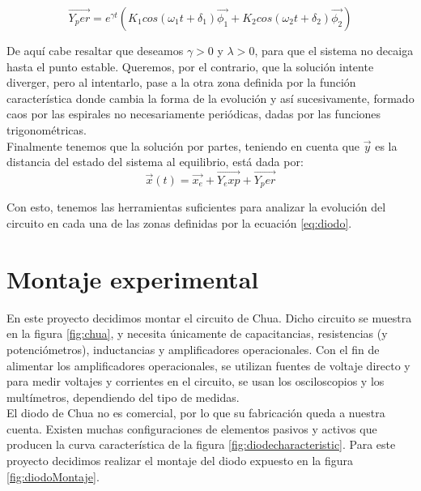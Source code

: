 \documentclass[%
 reprint,
 amsmath,amssymb,
 aps,
]{revtex4-1}
\begin{document}
\begin{equation}
\vec{Y_per} = e^{\gamma t}(K_1cos(\omega_1t+\delta_1)\vec{\phi_1}+
 K_2cos(\omega_2t+\delta_2)\vec{\phi_2})
\end{equation}

De aquí cabe resaltar que deseamos $\gamma >0$ y $\lambda> 0$, para que el sistema no decaiga hasta el punto estable. Queremos, por el contrario, que la solución intente diverger, pero al intentarlo, pase a la otra zona definida por la función característica donde cambia la forma de la evolución y así sucesivamente, formado caos por las espirales no necesariamente periódicas, dadas por las funciones trigonométricas.\\

Finalmente tenemos que la solución por partes, teniendo en cuenta que $\vec{y}$ es la distancia del estado del sistema al equilibrio, está dada por:\\

\begin{equation}
\vec{x}(t) = \vec{x_e}+ \vec{Y_exp} + \vec{Y_per}
\label{sis}
\end{equation}

Con esto, tenemos las herramientas suficientes para analizar la evolución del circuito en cada una de las zonas definidas por la ecuación \ref{eq:diodo}.\\
\section{\label{sec:level1}Montaje experimental}
En este proyecto decidimos montar el circuito de Chua. Dicho circuito se muestra en la figura \ref{fig:chua}, y necesita únicamente de capacitancias, resistencias (y potenciómetros), inductancias y amplificadores operacionales. Con el fin de alimentar los amplificadores operacionales, se utilizan fuentes de voltaje directo y para medir voltajes y corrientes en el circuito, se usan los osciloscopios y los multímetros, dependiendo del tipo de medidas.\\

El diodo de Chua no es comercial, por lo que su fabricación queda a nuestra cuenta. Existen muchas configuraciones de elementos pasivos y activos que producen la curva característica de la figura \ref{fig:diodecharacteristic}. Para este proyecto decidimos realizar el montaje del diodo expuesto en la figura \ref{fig:diodoMontaje}.\\
\end{document}
